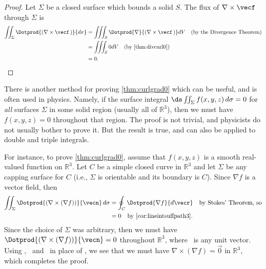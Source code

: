 \begin{proof}
 Let $\Sigma$ be a closed surface which bounds a solid $S$. The flux of $\nabla\times\vecf$ through $\Sigma$ is
 \begin{align*}
  \iint_{\Sigma} \Dotprod{(\nabla\times\vecf\,)}{d\sigma} &=
   \iiint_{S} \Dotprod{\nabla}{(\nabla\times\vecf\,)} dV\quad\text{(by the Divergence Theorem)}\\
   &= \iiint_{S} 0 dV \quad\text{(by \autoref{thm:divcurl0})}\\
   &= 0 .\qedhere
 \end{align*}
\end{proof}

There is another method for proving \autoref{thm:curlgrad0} which can be useful, and is often used in physics. Namely, if the surface integral $\ds\iint_{\Sigma} f(x,y,z)\,d\sigma = 0$ for \emph{all} surfaces $\Sigma$ in some solid region (usually all of $\mathbb{R}^{3}$), then we must have $f(x,y,z) = 0$ throughout that region. The proof is not trivial, and physicists do not usually bother to prove it. But the result is true, and can also be applied to double and triple integrals.

For instance, to prove \autoref{thm:curlgrad0}, assume that $f(x,y,z)$ is a smooth real-valued function on $\mathbb{R}^{3}$. Let $C$ be a simple closed curve in $\mathbb{R}^{3}$ and let $\Sigma$ be any capping surface for $C$ (i.e., $\Sigma$ is orientable and its boundary is $C$). Since $\nabla f$ is a vector field, then
\begin{align*}
 \iint_{\Sigma} \Dotprod{\left( \nabla\times(\nabla f) \right) }{\vecn}\,d\sigma &=
  \oint_{C}\Dotprod{\nabla f}{d\vecr} \quad\text{by Stokes' Theorem, so}\\
 &= 0 \quad\text{by \autoref{cor:lineintsuffpath3}.}
\end{align*}
Since the choice of $\Sigma$ was arbitrary, then we must have $\Dotprod{(\nabla\times(\nabla f))}{\vecn} = 0$ throughout $\mathbb{R}^{3}$, where \vecn\ is any unit vector. Using \veci, \vecj\ and \veck\ in place of \vecn, we see that we must have $\nabla\times(\nabla f) = \vec0$ in $\mathbb{R}^{3}$, which completes the proof.

